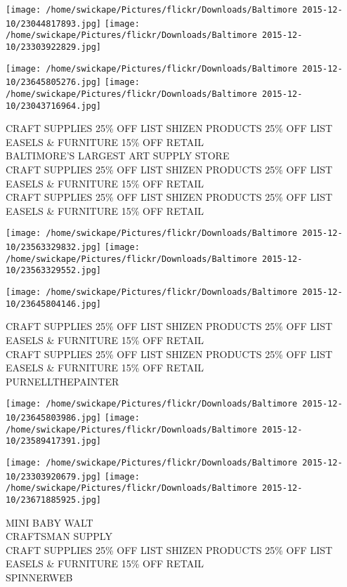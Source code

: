 \documentclass[10pt,letterpaper]{article}
\begin{document}
\texttt{[image: /home/swickape/Pictures/flickr/Downloads/Baltimore 2015-12-10/23044817893.jpg]}
\texttt{[image: /home/swickape/Pictures/flickr/Downloads/Baltimore 2015-12-10/23303922829.jpg]}

\texttt{[image: /home/swickape/Pictures/flickr/Downloads/Baltimore 2015-12-10/23645805276.jpg]}
\texttt{[image: /home/swickape/Pictures/flickr/Downloads/Baltimore 2015-12-10/23043716964.jpg]}

CRAFT SUPPLIES 25\% OFF LIST SHIZEN PRODUCTS 25\% OFF LIST EASELS \& FURNITURE 15\% OFF RETAIL\\
BALTIMORE'S LARGEST ART SUPPLY STORE\\
CRAFT SUPPLIES 25\% OFF LIST SHIZEN PRODUCTS 25\% OFF LIST EASELS \& FURNITURE 15\% OFF RETAIL\\
CRAFT SUPPLIES 25\% OFF LIST SHIZEN PRODUCTS 25\% OFF LIST EASELS \& FURNITURE 15\% OFF RETAIL\\
\pagebreak

\texttt{[image: /home/swickape/Pictures/flickr/Downloads/Baltimore 2015-12-10/23563329832.jpg]}
\texttt{[image: /home/swickape/Pictures/flickr/Downloads/Baltimore 2015-12-10/23563329552.jpg]}

\vspace{0.25in}
\texttt{[image: /home/swickape/Pictures/flickr/Downloads/Baltimore 2015-12-10/23645804146.jpg]}

CRAFT SUPPLIES 25\% OFF LIST SHIZEN PRODUCTS 25\% OFF LIST EASELS \& FURNITURE 15\% OFF RETAIL\\
CRAFT SUPPLIES 25\% OFF LIST SHIZEN PRODUCTS 25\% OFF LIST EASELS \& FURNITURE 15\% OFF RETAIL\\
PURNELLTHEPAINTER\\
\pagebreak

\texttt{[image: /home/swickape/Pictures/flickr/Downloads/Baltimore 2015-12-10/23645803986.jpg]}
\texttt{[image: /home/swickape/Pictures/flickr/Downloads/Baltimore 2015-12-10/23589417391.jpg]}

\texttt{[image: /home/swickape/Pictures/flickr/Downloads/Baltimore 2015-12-10/23303920679.jpg]}
\texttt{[image: /home/swickape/Pictures/flickr/Downloads/Baltimore 2015-12-10/23671885925.jpg]}

MINI BABY WALT\\
CRAFTSMAN SUPPLY\\
CRAFT SUPPLIES 25\% OFF LIST SHIZEN PRODUCTS 25\% OFF LIST EASELS \& FURNITURE 15\% OFF RETAIL\\
SPINNERWEB\\
\pagebreak
\end{document}
